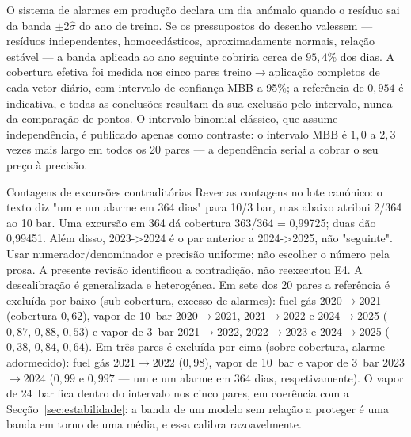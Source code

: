 O sistema de alarmes em produção declara um dia anómalo quando o resíduo sai
da banda $\pm 2\hat\sigma$ do ano de treino. Se os pressupostos do desenho
valessem --- resíduos independentes, homocedásticos, aproximadamente normais,
relação estável --- a banda aplicada ao ano seguinte cobriria cerca de
$95{,}4\%$ dos dias. A cobertura efetiva foi medida nos cinco pares
treino${\to}$aplicação completos de cada vetor diário, com intervalo de
confiança MBB a 95\%; a referência de $0{,}954$ é indicativa, e todas as
conclusões resultam da sua exclusão pelo intervalo, nunca da comparação de
pontos. O intervalo binomial clássico, que assume independência, é publicado
apenas como contraste: o intervalo MBB é $1{,}0$ a $2{,}3$ vezes mais largo em
todos os 20 pares --- a dependência serial a cobrar o seu preço à precisão.

{Contagens de excursões contraditórias}
{Rever as contagens no lote canónico: o texto diz "um e um alarme em 364
dias" para 10/3 bar, mas abaixo atribui 2/364 ao 10 bar. Uma excursão
em 364 dá cobertura 363/364 = 0,99725; duas dão 0,99451.
Além disso, 2023-\textgreater{}2024 é o par anterior a 2024-\textgreater{}2025, não "seguinte".
Usar numerador/denominador e precisão uniforme; não escolher o número
pela prosa. A presente revisão identificou a contradição, não reexecutou E4.}%
A descalibração é generalizada e heterogénea. Em sete dos 20 pares a
referência é excluída por baixo (sub-cobertura, excesso de alarmes): fuel gás
2020${\to}$2021 (cobertura $0{,}62$), vapor de 10~bar 2020${\to}$2021,
2021${\to}$2022 e 2024${\to}$2025 ($0{,}87$, $0{,}88$, $0{,}53$) e vapor de
3~bar 2021${\to}$2022, 2022${\to}$2023 e 2024${\to}$2025 ($0{,}38$, $0{,}84$,
$0{,}64$). Em três pares é excluída por cima (sobre-cobertura, alarme
adormecido): fuel gás 2021${\to}$2022 ($0{,}98$), vapor de 10~bar e vapor de
3~bar 2023${\to}$2024 ($0{,}99$ e $0{,}997$ --- um e um alarme em 364 dias,
respetivamente). O vapor de 24~bar fica dentro do intervalo nos cinco pares,
em coerência com a Secção~\ref{sec:estabilidade}: a banda de um modelo sem
relação a proteger é uma banda em torno de uma média, e essa calibra
razoavelmente.

